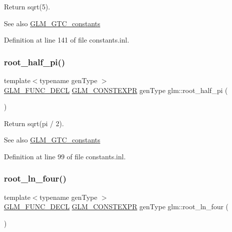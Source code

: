 Return sqrt(5). \begin{DoxySeeAlso}{See also}
\mbox{\hyperlink{group__gtc__constants}{G\+L\+M\+\_\+\+G\+T\+C\+\_\+constants}} 
\end{DoxySeeAlso}


Definition at line 141 of file constants.\+inl.

\mbox{\label{group__gtc__constants_ga4e276cb823cc5e612d4f89ed99c75039}} 
\subsubsection{\texorpdfstring{root\_half\_pi()}{root\_half\_pi()}}
{\footnotesize\ttfamily template$<$typename gen\+Type $>$ \\
\mbox{\hyperlink{setup_8hpp_ab2d052de21a70539923e9bcbf6e83a51}{G\+L\+M\+\_\+\+F\+U\+N\+C\+\_\+\+D\+E\+CL}} \mbox{\hyperlink{setup_8hpp_a08b807947b47031d3a511f03f89645ad}{G\+L\+M\+\_\+\+C\+O\+N\+S\+T\+E\+X\+PR}} gen\+Type glm\+::root\+\_\+half\+\_\+pi (\begin{DoxyParamCaption}{ }\end{DoxyParamCaption})}

Return sqrt(pi / 2). \begin{DoxySeeAlso}{See also}
\mbox{\hyperlink{group__gtc__constants}{G\+L\+M\+\_\+\+G\+T\+C\+\_\+constants}} 
\end{DoxySeeAlso}


Definition at line 99 of file constants.\+inl.

\mbox{\label{group__gtc__constants_ga4129412e96b33707a77c1a07652e23e2}} 
\subsubsection{\texorpdfstring{root\_ln\_four()}{root\_ln\_four()}}
{\footnotesize\ttfamily template$<$typename gen\+Type $>$ \\
\mbox{\hyperlink{setup_8hpp_ab2d052de21a70539923e9bcbf6e83a51}{G\+L\+M\+\_\+\+F\+U\+N\+C\+\_\+\+D\+E\+CL}} \mbox{\hyperlink{setup_8hpp_a08b807947b47031d3a511f03f89645ad}{G\+L\+M\+\_\+\+C\+O\+N\+S\+T\+E\+X\+PR}} gen\+Type glm\+::root\+\_\+ln\+\_\+four (\begin{DoxyParamCaption}{ }\end{DoxyParamCaption})}

